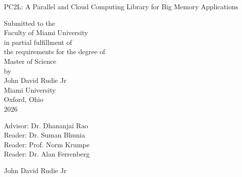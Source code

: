 \documentclass[12pt, oneside]{book2}
\begin{document}
\begin{titlepage}
\begin{center}
PC2L: A Parallel and Cloud Computing Library for Big Memory Applications

\vspace{1.5cm}


\vspace{0.5cm}

Submitted to the \\
Faculty of Miami University \\
in partial fulfillment of \\
the requirements for the degree of \\
Master of Science \\
by \\
John David Rudie Jr \\
Miami University \\
Oxford, Ohio \\
2026

\vspace{1.5cm}

Advisor: Dr. Dhananjai Rao\\
Reader: Dr. Suman Bhunia \\
Reader: Prof. Norm Krumpe\\
Reader: Dr. Alan Ferrenberg\\


\vspace{1.5cm}

 John David Rudie Jr

\end{center}

\end{titlepage}




\singlespacing
\setcounter{page}{3}
\tableofcontents
\setcounter{tocdepth}{2}
\cleardoublepage
{}
\listoftables
\cleardoublepage
{}
\listoffigures

\newpage


\mainmatter







\backmatter



\end{document}
